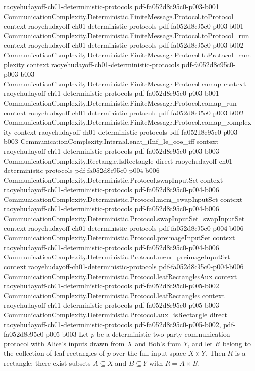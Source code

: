 \begin{lemma}
  {raoyehudayoff-ch01-deterministic-protocols}
  {pdf-fa052d8c95c0-p003-b001}
\proofstep
  {CommunicationComplexity.Deterministic.FiniteMessage.Protocol.toProtocol}
  {context}
  {raoyehudayoff-ch01-deterministic-protocols}
  {pdf-fa052d8c95c0-p003-b001}
\proofstep
  {CommunicationComplexity.Deterministic.FiniteMessage.Protocol.toProtocol_run}
  {context}
  {raoyehudayoff-ch01-deterministic-protocols}
  {pdf-fa052d8c95c0-p003-b002}
\proofstep
  {CommunicationComplexity.Deterministic.FiniteMessage.Protocol.toProtocol_complexity}
  {context}
  {raoyehudayoff-ch01-deterministic-protocols}
  {pdf-fa052d8c95c0-p003-b003}
\proofstep
  {CommunicationComplexity.Deterministic.FiniteMessage.Protocol.comap}
  {context}
  {raoyehudayoff-ch01-deterministic-protocols}
  {pdf-fa052d8c95c0-p003-b001}
\proofstep
  {CommunicationComplexity.Deterministic.FiniteMessage.Protocol.comap_run}
  {context}
  {raoyehudayoff-ch01-deterministic-protocols}
  {pdf-fa052d8c95c0-p003-b002}
\proofstep
  {CommunicationComplexity.Deterministic.FiniteMessage.Protocol.comap_complexity}
  {context}
  {raoyehudayoff-ch01-deterministic-protocols}
  {pdf-fa052d8c95c0-p003-b003}
\proofstep
  {CommunicationComplexity.Internal.enat_iInf_le_coe_iff}
  {context}
  {raoyehudayoff-ch01-deterministic-protocols}
  {pdf-fa052d8c95c0-p003-b003}
\proofstep
  {CommunicationComplexity.Rectangle.IsRectangle}
  {direct}
  {raoyehudayoff-ch01-deterministic-protocols}
  {pdf-fa052d8c95c0-p004-b006}
\proofstep
  {CommunicationComplexity.Deterministic.Protocol.swapInputSet}
  {context}
  {raoyehudayoff-ch01-deterministic-protocols}
  {pdf-fa052d8c95c0-p004-b006}
\proofstep
  {CommunicationComplexity.Deterministic.Protocol.mem_swapInputSet}
  {context}
  {raoyehudayoff-ch01-deterministic-protocols}
  {pdf-fa052d8c95c0-p004-b006}
\proofstep
  {CommunicationComplexity.Deterministic.Protocol.swapInputSet_swapInputSet}
  {context}
  {raoyehudayoff-ch01-deterministic-protocols}
  {pdf-fa052d8c95c0-p004-b006}
\proofstep
  {CommunicationComplexity.Deterministic.Protocol.preimageInputSet}
  {context}
  {raoyehudayoff-ch01-deterministic-protocols}
  {pdf-fa052d8c95c0-p004-b006}
\proofstep
  {CommunicationComplexity.Deterministic.Protocol.mem_preimageInputSet}
  {context}
  {raoyehudayoff-ch01-deterministic-protocols}
  {pdf-fa052d8c95c0-p004-b006}
\proofstep
  {CommunicationComplexity.Deterministic.Protocol.leafRectanglesAux}
  {context}
  {raoyehudayoff-ch01-deterministic-protocols}
  {pdf-fa052d8c95c0-p005-b002}
\proofstep
  {CommunicationComplexity.Deterministic.Protocol.leafRectangles}
  {context}
  {raoyehudayoff-ch01-deterministic-protocols}
  {pdf-fa052d8c95c0-p005-b003}
\proofstep
  {CommunicationComplexity.Deterministic.Protocol.aux_isRectangle}
  {direct}
  {raoyehudayoff-ch01-deterministic-protocols}
  {pdf-fa052d8c95c0-p005-b002,
    pdf-fa052d8c95c0-p005-b003}
Let $p$ be a deterministic two-party communication protocol with Alice's inputs drawn
from $X$ and Bob's from $Y$, and let $R$ belong to the collection of leaf rectangles of
$p$ over the full input space $X \times Y$. Then $R$ is a rectangle: there exist subsets
$A \subseteq X$ and $B \subseteq Y$ with $R = A \times B$.
\end{lemma}

